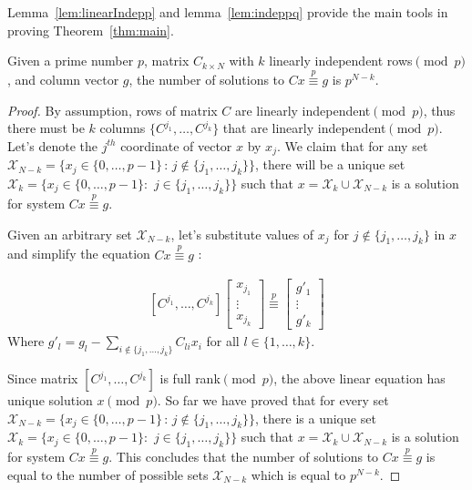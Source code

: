 \documentclass[anon,12pt]{colt2016}
\begin{document}
Lemma~\ref{lem:linearIndepp} and lemma~\ref{lem:indeppq} provide the main tools in proving Theorem~\ref{thm:main}.





\begin{lemma}
\label{lem:linearIndepp}
Given a prime number $p$, matrix $C_{k\times N}$ with $k$ linearly independent rows$\pmod{p}$, and column vector ${g}$, the number of solutions to $C{x} \overset{p}{\equiv} {g}$ is $p^{N-k}$.
\end{lemma}


\begin{proof}  	
By assumption, rows of matrix $C$ are linearly independent$\pmod{p}$, thus there must be $k$ columns $\{C^{j_1},\ldots,C^{j_k}\}$ that are linearly independent$\pmod{p}$.   
   Let's denote the $j^{th}$ coordinate of vector $x$ by $x_j$. We claim that for any set $\mathcal{X}_{N-k}=\{{x}_j\in\{0,\ldots,p-1\}\, : \, j \notin \{j_1,\ldots,j_k\} \}$, there will be a unique set $\mathcal{X}_k=\{{x}_j\in\{0,\ldots,p-1\}:\,\, j\in\{j_1,\ldots,j_k\}\}$ such that $x=\mathcal{X}_k \cup\mathcal{X}_{N-k}$ is a solution for system $C{x}\overset{p}{\equiv} {g}$.
 
  Given an arbitrary set $\mathcal{X}_{N-k}$, let's substitute values of $x_j$ for $j\notin\{j_1,\ldots,j_{k}\}$ in ${x}$ and simplify the equation $Cx\overset{p}{\equiv} g$ :
 
 $$
  \begin{array}{l}
 [C^{j_1},\ldots, C^{j_k}] 
 \left[ \begin{array}{l}
 x_{j_1} \\
 \vdots \\
 x_{j_k}
 \end{array}	 \right] \overset{p}{\equiv}
 \left[\begin{array}{l}
 g'_{1} \\
 \vdots \\
 g'_{k}
 \end{array}\right] 
  \end{array} 
  $$
Where $g'_{l}= g_l -\sum_{i\notin \{j_1,\ldots,j_k\}} C_{li}x_{i}$ for all $l\in\{1,\ldots,k\}$. 

Since matrix $[C^{j_1},\ldots,C^{j_k}]$ is full rank$\pmod{p}$, the above linear equation has unique solution ${x}\pmod{p}$. So far we have proved that for every set $\mathcal{X}_{N-k}=\{{x}_j\in\{0,\ldots,p-1\}\, : \, j \notin \{j_1,\ldots,j_k\} \}$, there is a unique set $\mathcal{X}_k=\{{x}_j\in\{0,\ldots,p-1\}:\,\, j\in\{j_1,\ldots,j_k\}\}$ such that $x=\mathcal{X}_k \cup\mathcal{X}_{N-k}$ is a solution for system $C{x}\overset{p}{\equiv} {g}$. This concludes that the number of solutions to $C{x}\overset{p}{\equiv} {g}$ is equal to the number of possible sets $\mathcal{X}_{N-k}$ which is equal to $p^{N-k}$. 

\end{proof}
\end{document}
